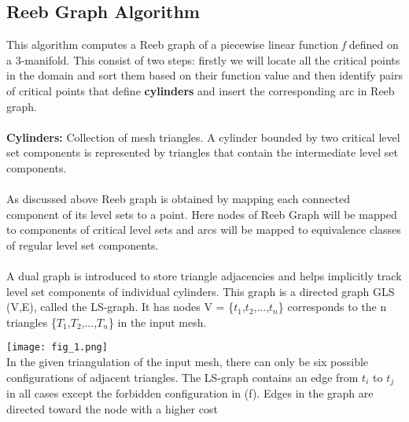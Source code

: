 \documentclass[a4paper]{article}
\begin{document}
\begin{multicols}{2}
\section{Reeb Graph Algorithm}
This algorithm computes a Reeb graph of a piecewise linear function \textit{ƒ} defined on a 3-manifold.
This consist of two steps: firstly we will locate all the critical points in the domain and sort them based on their function value and then identify pairs of critical points that define \textbf{cylinders} and insert the corresponding arc in Reeb graph.\\\\
\textbf{Cylinders:} Collection of mesh triangles. A cylinder bounded by two critical level set components is represented by triangles that contain the intermediate level set components.\\\\
As discussed above Reeb graph is obtained by mapping each connected component of its level sets to a point. Here nodes of Reeb Graph will be mapped to components of critical level sets and arcs will be mapped to equivalence classes of regular level set components.\\\\
A dual graph is introduced to store triangle adjacencies and helps implicitly track level set components of individual cylinders. This graph is a  directed graph GLS (V,E), called the LS-graph. It has nodes V = \{$t_{1}$,$t_{2}$,...,$t_{n}$\} corresponds to the n triangles \{$T_{1}$,$T_{2}$,...,$T_{n}$\} in the input mesh. 

\texttt{[image: fig\_1.png]} \\
In the given triangulation of the input mesh, there can only be six possible configurations of adjacent triangles. The LS-graph contains an edge from $t_{i}$ to $t_{j}$ in all cases except the forbidden configuration in (f). Edges in the graph are directed toward the node with a higher cost


\end{multicols}
\end{document}
